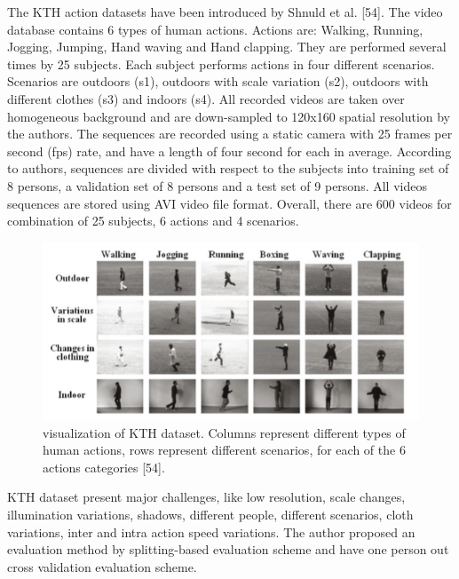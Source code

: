 The KTH action datasets have been introduced by Shnuld et al. [54]. The video database contains 6 types of human actions. Actions are: Walking, Running, Jogging, Jumping, Hand waving and Hand clapping. They are performed several times by 25 subjects. Each subject performs actions in four different scenarios. Scenarios are outdoors (s1), outdoors with scale variation (s2), outdoors with different clothes (s3) and indoors (s4). All recorded videos are taken over homogeneous background and are down-sampled to 120x160 spatial resolution by the authors. The sequences are recorded using a static camera with 25 frames per second (fps) rate, and have a length of four second for each in average. According to authors, sequences are divided with respect to the subjects into training set of 8 persons, a validation set of 8 persons and a test set of 9 persons. All videos sequences are stored using AVI video file format. Overall, there are 600 videos for combination of 25 subjects, 6 actions and 4 scenarios. 
\begin{figure}[ht]
\centering
\includegraphics{Figures/dt1}
\decoRule
\caption[visualization of KTH dataset. Columns represent different types of human actions, rows represent different scenarios, for each of the 6 actions categories "54"]{visualization of KTH dataset. Columns represent different types of human actions, rows represent different scenarios, for each of the 6 actions categories [54].}
\label{fig:la}
\end{figure}
KTH dataset present major challenges, like low resolution, scale changes, illumination variations, shadows, different people, different scenarios, cloth variations, inter and intra action speed variations. The author proposed an evaluation method by splitting-based evaluation scheme and have one person out cross validation evaluation scheme.\\

